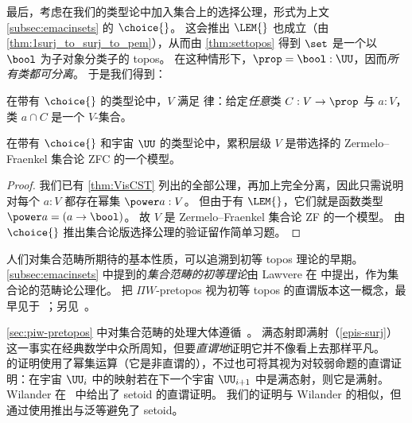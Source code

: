 最后，考虑在我们的类型论中加入集合上的选择公理，形式为上文 \cref{subsec:emacinsets} 的 $\choice{}$。
这会推出 $\LEM{}$ 也成立（由 \cref{thm:1surj_to_surj_to_pem}），从而由 \cref{thm:settopos} 得到 $\set$ 是一个以 $\bool$ 为子对象分类子的 topos。
在这种情形下，$\prop = \bool:\UU$，因而\emph{所有类都可分离}。
于是我们得到：

\begin{lem}\label{lem:fullsep}
  在带有 $\choice{}$ 的类型论中，$V$ 满足
  律：给定\emph{任意}类 $C : V \to \prop$ 与 $a : V$，类 $a \cap C$ 是一个 $V$-集合。
\end{lem}

\begin{thm}\label{thm:zfc}
在带有 $\choice{}$ 和宇宙 $\UU$ 的类型论中，累积层级 $V$ 是带选择的 Zermelo--Fraenkel 集合论 ZFC 的一个模型。
\end{thm}

\begin{proof}
我们已有 \cref{thm:VisCST} 列出的全部公理，再加上完全分离，因此只需说明对每个 $a:V$ 都存在幂集 $\power a:V$。
但由于有 $\LEM{}$，它们就是函数类型 $\power a = (a\to\bool)$。
故 $V$ 是 Zermelo--Fraenkel 集合论 ZF 的一个模型。
由 $\choice{}$ 推出集合论版选择公理的验证留作简单习题。
\end{proof}

%

\sectionNotes

人们对集合范畴所期待的基本性质，可以追溯到初等 topos 理论的早期。
\cref{subsec:emacinsets} 中提到的\emph{集合范畴的初等理论}由 Lawvere 在
\cite{lawvere:etcs-long} 中提出，作为集合论的范畴论公理化。
%
把 $\Pi W$-pretopos 视为初等 topos 的直谓版本这一概念，最早见于~\cite{MoerdijkPalmgren2002}；另见~\cite{palmgren:cetcs}。

\cref{sec:piw-pretopos} 中对集合范畴的处理大体遵循~\cite{RijkeSpitters}。
满态射即满射（\cref{epis-surj}）这一事实在经典数学中众所周知，但要\emph{直谓地}证明它并不像看上去那样平凡。
%
~\cite{Mines/R/R:1988} 的证明使用了幂集运算（它是非直谓的），不过也可将其视为对较弱命题的直谓证明：在宇宙 $\UU_i$ 中的映射若在下一个宇宙 $\UU_{i+1}$ 中是满态射，则它是满射。
Wilander 在~\cite{Wilander2010} 中给出了 setoid 的直谓证明。
我们的证明与 Wilander 的相似，但通过使用推出与泛等避免了 setoid。

